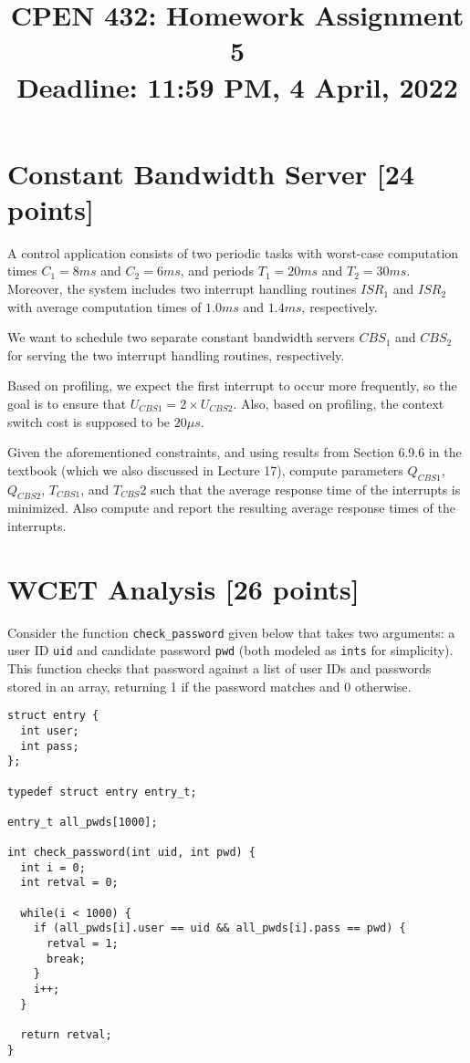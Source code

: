 \documentclass[12pt]{article}
\title{
  CPEN 432: Homework Assignment 5 \\
  \large
  Deadline: 11:59 PM, 4 April, 2022
}
\date{}
\begin{document}
\maketitle

\setlength{\baselineskip}{0.90\baselineskip}

\pagestyle{empty}

\section{Constant Bandwidth Server [24 points]}

A control application consists of two periodic tasks with worst-case
computation times $C_1= 8ms$ and $C_2 = 6ms$, and periods $T_1 = 20ms$ and
$T_2 = 30ms$.
Moreover, the system includes two interrupt handling routines $ISR_1$ and
$ISR_2$ with average computation times of $1.0ms$ and $1.4ms$, respectively.

We want to schedule two separate constant bandwidth servers $CBS_1$ and $CBS_2$
for serving the two interrupt handling routines, respectively.

Based on profiling, we expect the first interrupt to occur more frequently, so
the goal is to ensure that $U_{CBS1} = 2 \times U_{CBS2}$.
Also, based on profiling, the context switch cost is supposed to be $20 \mu s$.

Given the aforementioned constraints, and using results from Section 6.9.6
in the textbook (which we also discussed in Lecture 17),
compute parameters $Q_{CBS1}$, $Q_{CBS2}$, $T_{CBS1}$, and $T_{CBS}2$ such that
the average response time of the interrupts is minimized.
Also compute and report the resulting average response times of the interrupts.

\section{WCET Analysis [26 points]}

Consider the function \texttt{check\_password} given below that takes two
arguments: a user ID \texttt{uid} and candidate password \texttt{pwd} (both
modeled as \texttt{ints} for simplicity). This function checks that password
against a list of user IDs and passwords stored in an array, returning 1 if the
password matches and 0 otherwise.

\begin{lstlisting}
struct entry {
  int user;
  int pass;
};

typedef struct entry entry_t;

entry_t all_pwds[1000];

int check_password(int uid, int pwd) {
  int i = 0;
  int retval = 0;

  while(i < 1000) {
    if (all_pwds[i].user == uid && all_pwds[i].pass == pwd) {
      retval = 1;
      break;
    }
    i++;
  }

  return retval;
}
\end{lstlisting}
\end{document}
